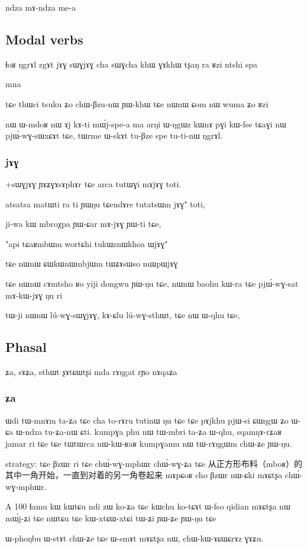 \documentclass[oldfontcommands,oneside,a4paper,11pt]{article}
\begin{document}
  ndza mɤ-ndza me-a
  
  
  \subsection{Modal verbs}
 ɬoʁ
ŋgrɤl
zgɤt
jɤɣ sɯɣjɤɣ
cha sɯɣcha
khɯ ɣɤkhɯ
tʂaŋ
ra
ʁzi
ntshi
spa

 
mna

tɕe thɯci tsuku ʑo chɯ-βzu-nɯ ɲɯ-khɯ
tɕe nɯnɯ ɕom nɯ wuma ʑo ʁzi

nɯ ɯ-mdoʁ nɯ ɤj kɤ-ti mɯ́j-spe-a ma arŋi ɯ-ŋgɯz kɯnɤ pɣi kɯ-fse
tɕaɣi nɯ pjɯ́-wɣ-sɯxɕɤt tɕe, tɯrme ɯ-skɤt tu-βze spe tu-ti-nɯ ŋgrɤl.


 \subsubsection{jɤɣ}
 +sɯɣjɤɣ
 ɲɤʑɣɤsɤphɤr tɕe arca tutɯɣi mɤjɤɣ toti.

atsatsa matɯti ra ti ɲɯŋu
tɕendɤre tutatsɯm jɤɣ" toti,

ji-wa kɯ mbroχpa ɲɯ-ɕar mɤ-jɤɣ ɲɯ-ti tɕe,

"api tɕaʁmbɯm wortɕhi tukɯznɯkhoa ɯjɤɣ"

tɕe nɯnɯ ɕɯkɯnɯmbjɯm tɯʑɤsɯso mɯpɯjɤɣ

tɕe nɯnɯ cɤmtsho ʁo yiji dongwu ɲɯ-ŋu tɕe, nɯnɯ
baohu kɯ-ra tɕe pjɯ́-wɣ-sat mɤ-kɯ-jɤɣ ŋu ri
 
tɯ-ji nɯnɯ lú-wɣ-sɯɣjɤɣ, kɤ-ɕlu lú-wɣ-sthɯt, tɕe nɯ ɯ-qhu tɕe,
\subsection{Phasal}
ʑa, sɤʑa, sthɯt ʂɤtɕɯtʂi mda rɤŋgat rɲo
nɤqaʑa
\subsubsection{ʑa}
 ɯdi tɯ-mnɤm ta-ʑa tɕe cha to-rɤru tutinɯ ŋu tɕe
tɕe pɤjkhu pjɯ-si ɕɯŋgɯ ʑo ɯ-ɕa ɯ-ndza tu-ʑa-nɯ ɕti.
kumpɣa phu nɯ tɯ-mbri ta-ʑa ɯ-qhu, 
sqamŋɤ-rʑaʁ jamar ri tɕe tɕe tɯtɯrca nɯ-kɯ-ʁaʁ kumpɣamu nɯ tɯ-rɤŋgɯm chɯ-ʑe ɲɯ-ŋu.

strategy:
tɕe βzɯr ri tɕe chɯ́-wɣ-mphɯr chɯ́-wɣ-ʑa tɕe 从正方形布料（mboʁ）的其中一角开始，一直到对着的另一角卷起来
mɤpɕoʁ cho βzɯr nɯ-ɕki mɤɕtʂa chɯ́-wɣ-mphɯr.

A	100	ɬamu	kɯ	kɯtɕu	ndi	zɯ	ko-ʑa	tɕe	kɯchu	ko-tɕɤt
ɯ-fso qidian mɤɕtʂa nɯ mɯ́j-ʑi
tɕe nɯtɕu tɕe kɯ-xtɕɯ-xtɕi tɯ-ʑi ɲɯ-ʑe ɲɯ-ŋu tɕe

ɯ-phoŋbu ɯ-stɤt chɯ-ʑe tɕe ɯ-smɤt mɤɕtʂa nɯ,
chɯ-kɯ-ɤɕɯɕrɤz ɣɤʑu.
\end{document}
